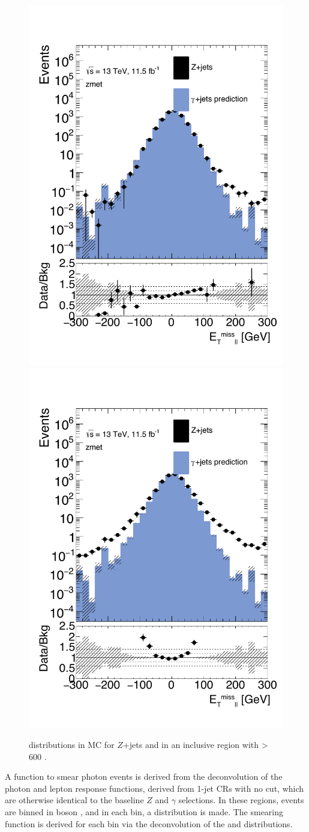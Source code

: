 \begin{centering}
\begin{figure}[!hbt]
\myfloatalign
\includegraphics[width=.45\linewidth]{figures/photons/MC_hist_METl_Pt_0_ee_2j_2016_mcmetl_ptrw__zmet_.pdf}
\includegraphics[width=.45\linewidth]{figures/photons/MC_hist_METl_Pt_0_mm_2j_2016_mcmetl_ptrw__zmet_.pdf}
\caption{\metl distributions in \ac{MC} for $Z$+jets and \gjets in an inclusive region with \HT > 600 \gev.}
\label{fig:photon_metparallel}
\end{figure}
\end{centering}

A function to smear photon events is derived from the deconvolution of the photon and lepton response functions, derived from 1-jet \acp{CR} with no \HT cut, which are otherwise identical to the baseline $Z$ and $\gamma$ selections. In these regions, events are binned in boson \pt, and in each bin, a \metl distribution is made. The smearing function is derived for each bin via the deconvolution of the \dyjets and \gjets distributions. 

